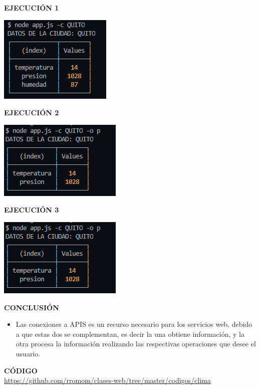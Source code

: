\documentclass{report}
\begin{document}
   \textbf{EJECUCIÓN 1}
   \begin{center}
       \includegraphics[scale=0.9]{ej1.PNG}
     \end{center}
   \textbf{EJECUCIÓN 2}
   \begin{center}
       \includegraphics[scale=0.9]{ej2.PNG}
     \end{center}
     \textbf{EJECUCIÓN 3}
     \begin{center}
       \includegraphics[scale=0.9]{ej3.PNG}
     \end{center}
   \textbf{CONCLUSIÓN}
   \begin{itemize}
       \item Las conexiones a APIS es un recurso necesario para los servicios web, debido a que estas dos se complementan, es decir la una obtiene información, y la otra procesa la información realizando las respectivas operaciones que desee el usuario.
   \end{itemize}
   
   \textbf{CÓDIGO}
   \\
   \url{https://github.com/rromom/clases-web/tree/master/codigos/clima}
\end{document}
